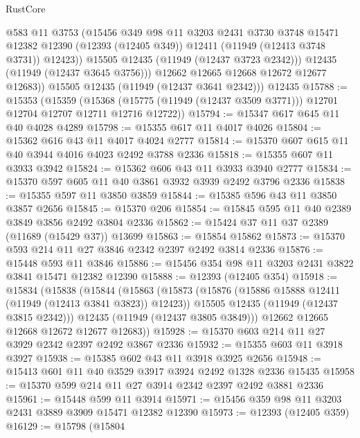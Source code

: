\begin{lexlean}{RustCore}
\begin{coremodule}
                @583
                @11
                @3753
                (@15456
                  @349
                  @98
                  @11
                  @3203
                  @2431
                  @3730
                  @3748
                  @15471
                  @12382
                  @12390
                  (@12393 (@12405 @349))
                  @12411
                  (@11949 (@12413 @3748 @3731))
                  @12423))
              @15505
              @12435
              (@11949 (@12437 @3723 @2342)))
            @12435
            (@11949 (@12437 @3645 @3756)))
          @12662
          @12665
          @12668
          @12672
          @12677
          @12683))
      @15505
      @12435
      (@11949 (@12437 @3641 @2342)))
    @12435
@15788 := @15353
    (@15359
      (@15368 (@15775 (@11949 (@12437 @3509 @3771))) @12701 @12704 @12707 @12711 @12716 @12722))
@15794 := @15347 @617 @645 @11 @40 @4028 @4289
@15798 := @15355 @617 @11 @4017 @4026
@15804 := @15362 @616 @43 @11 @4017 @4024 @2777
@15814 := @15370 @607 @615 @11 @40 @3944 @4016 @4023 @2492 @3788 @2336
@15818 := @15355 @607 @11 @3933 @3942
@15824 := @15362 @606 @43 @11 @3933 @3940 @2777
@15834 := @15370 @597 @605 @11 @40 @3861 @3932 @3939 @2492 @3796 @2336
@15838 := @15355 @597 @11 @3850 @3859
@15844 := @15385 @596 @43 @11 @3850 @3857 @2656
@15845 := @15370 @206
@15854 := @15845 @595 @11 @40 @2389 @3849 @3856 @2492 @3804 @2336
@15862 := @15424 @37 @11 @37 @2389 (@11689 (@15429 @37)) @13699
@15863 := @15854 @15862
@15873 := @15370 @593 @214 @11 @27 @3846 @2342 @2397 @2492 @3814 @2336
@15876 := @15448 @593 @11 @3846
@15886 := @15456 @354 @98 @11 @3203 @2431 @3822 @3841 @15471 @12382 @12390
@15888 := @12393 (@12405 @354)
@15918 := @15834
    (@15838
      (@15844
        (@15863
          (@15873
            (@15876 (@15886 @15888 @12411 (@11949 (@12413 @3841 @3823)) @12423))
            @15505
            @12435
            (@11949 (@12437 @3815 @2342)))
          @12435
          (@11949 (@12437 @3805 @3849)))
        @12662
        @12665
        @12668
        @12672
        @12677
        @12683))
@15928 := @15370 @603 @214 @11 @27 @3929 @2342 @2397 @2492 @3867 @2336
@15932 := @15355 @603 @11 @3918 @3927
@15938 := @15385 @602 @43 @11 @3918 @3925 @2656
@15948 := @15413 @601 @11 @40 @3529 @3917 @3924 @2492 @1328 @2336 @15435
@15958 := @15370 @599 @214 @11 @27 @3914 @2342 @2397 @2492 @3881 @2336
@15961 := @15448 @599 @11 @3914
@15971 := @15456 @359 @98 @11 @3203 @2431 @3889 @3909 @15471 @12382 @12390
@15973 := @12393 (@12405 @359)
@16129 := @15798
    (@15804

\end{coremodule}
\end{lexlean}
